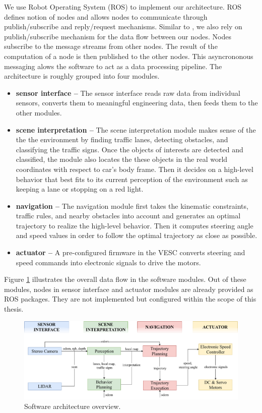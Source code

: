 We use Robot Operating System (ROS) \cite{cite3} to implement our architecture.
ROS defines notion of nodes and allows nodes to communicate through
publish/subscribe and reply/request mechanisms. Similar to \cite{cite1}, we
also rely on publish/subscribe mechanism for the data flow between our nodes.
Nodes subscribe to the message streams from other nodes. The result of the
computation of a node is then published to the other nodes. This asyncrononous
messaging alows the software to act as a data processing pipeline. The
architecture is roughly grouped into four modules.

\begin{itemize}
    \item \textbf{sensor interface --} The sensor interface reads raw data from
        individual sensors, converts them to meaningful engineering data, then
        feeds them to the other modules.
    \item \textbf{scene interpretation --} The scene interpretation module
        makes sense of the the the environment by finding traffic lanes,
        detecting obstacles, and classifying the traffic signs. Once the
        objects of interests are detected and classified, the module also
        locates the these objects in the real world coordinates with respect to
        car's body frame. Then it decides on a high-level behavior that best
        fits to its current perception of the environment such as keeping a
        lane or stopping on a red light.
    \item \textbf{navigation --} The navigation module first takes the
        kinematic constraints, traffic rules, and nearby obstacles into account
        and generates an optimal trajectory to realize the high-level behavior.
        Then it computes steering angle and speed values in order to follow the
        optimal trajectory as close as possible.
    \item \textbf{actuator --} A pre-configured firmware in the VESC converts
        steering and speed commands into electronic signals to drive the
        motors.
\end{itemize}

Figure \ref{figure:software-architecture} illustrates the overall data flow in
the software modules. Out of these modules, nodes in sensor interface and
actuator modules are already provided as ROS packages. They are not implemented
but configured within the scope of this thesis.

\begin{figure}[h]
\centering
\includegraphics[width=.9\textwidth]{figures/software-architecture.pdf}
\caption{Software architecture overview.}
\label{figure:software-architecture}
\end{figure}

